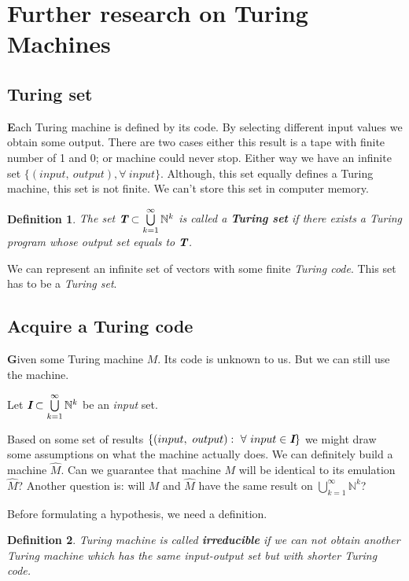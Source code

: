 \documentclass[12pt]{article}
\def\mathbi#1{\textbf{\em #1}}
\newtheorem{definition}{Definition}[section]
\begin{document}
\section{Further research on Turing Machines}
\subsection{Turing set}
\textbf{\large E}ach Turing machine is defined by its code. By selecting different input values we obtain some output. There are two cases either this result is a tape with finite number of 1 and 0; or machine could never stop. Either way we have an infinite set $\{(input,\ output), \forall\ input\}$. Although, this set equally defines a Turing machine, this set is not finite. We can't store this set in computer memory.

\begin{definition}
The set $\mathbi{T}\subset\bigcup\limits_{k=1}^{\infty}\mathbb{N}^k$ is called a \textbf{Turing set} if there exists a Turing program whose output set equals to $\mathbi{T}$.
\end{definition}

We can represent an infinite set of vectors with some finite \emph{Turing code}. This set has to be a \emph{Turing set}.

\subsection{Acquire a Turing code}
\textbf{\large G}iven some Turing machine $M$. Its code is unknown to us. But we can still use the machine. 

Let $\mathbi{I}\subset\bigcup\limits_{k=1}^{\infty}\mathbb{N}^k$ be an \emph{input} set.

Based on some set of results $\{(input,\ output):\  \forall\ input\in \mathbi{I}\}$ we might draw some assumptions on what the machine actually does. We can definitely build a machine $\hat{M}$. Can we guarantee that machine $M$ will be identical to its emulation $\hat{M}$? Another question is: will $M$ and $\hat{M}$ have the same result on $\bigcup\limits_{k=1}^{\infty}\mathbb{N}^k$?

Before formulating a hypothesis, we need a definition.

\begin{definition}
Turing machine is called \textbf{irreducible} if we can not obtain another Turing machine which has the same input-output set but with shorter Turing code. 
\end{definition}
\end{document}
